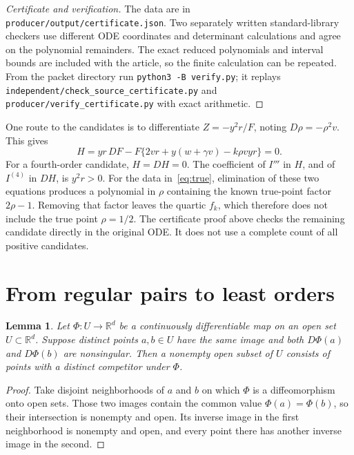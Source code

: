 \documentclass[10pt,a4paper]{article}
\newtheorem{lemma}[theorem]{Lemma}
\newcommand{\R}{\mathbb R}
\begin{document}
\begin{proof}[Certificate and verification]
The data are in \texttt{producer/output/certificate.json}.
Two separately written standard-library checkers use different ODE
coordinates and determinant calculations and agree on the polynomial
remainders. The exact reduced polynomials and interval bounds are
included with the article, so the finite calculation can be repeated.
From the packet directory run \texttt{python3 -B verify.py}; it
replays \texttt{independent/check\_source\_certificate.py} and
\texttt{producer/verify\_certificate.py} with exact arithmetic.
\end{proof}

One route to the candidates is to differentiate
$Z=-y^2r/F$, noting $D\rho=-\rho^2v$. This gives
\begin{equation}
H=yr\,DF-F\{2vr+y(w+\gamma v)-k\rho vyr\}=0.
\label{eq:H}
\end{equation}
For a fourth-order candidate, $H=DH=0$. The coefficient of $I'''$
in $H$, and of $I^{(4)}$ in $DH$, is $y^2r>0$.
For the data in~\eqref{eq:true}, elimination of these two equations
produces a polynomial in $\rho$ containing the known true-point factor
$2\rho-1$. Removing that factor leaves the quartic $f_k$, which
therefore does not include the true point $\rho=1/2$.
The certificate proof above checks the remaining candidate directly
in the original ODE.
It does not use a complete count of all positive candidates.

\section{From regular pairs to least orders}
\label{sec:minimal}
\begin{lemma}
\label{lem:two-branches}
Let $\Phi:U\to\R^d$ be a continuously differentiable map on an open
set $U\subset\R^d$. Suppose distinct points $a,b\in U$ have the same
image and both $D\Phi(a)$ and $D\Phi(b)$ are nonsingular. Then a
nonempty open subset of $U$ consists of points with a distinct
competitor under $\Phi$.
\end{lemma}
\begin{proof}
Take disjoint neighborhoods of $a$ and $b$ on which $\Phi$ is a
diffeomorphism onto open sets. Those two images contain the common
value $\Phi(a)=\Phi(b)$, so their intersection is nonempty and open.
Its inverse image in the first neighborhood is nonempty and open,
and every point there has another inverse image in the second.
\end{proof}
\end{document}
